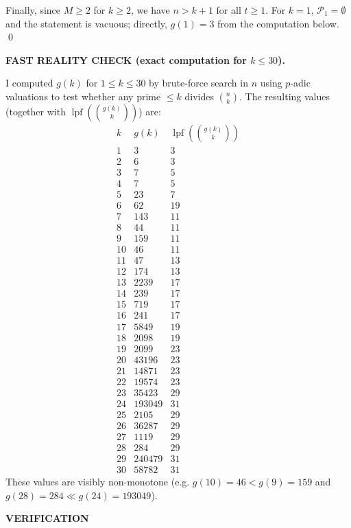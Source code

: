 Finally, since $M\ge 2$ for $k\ge 2$, we have $n>k+1$ for all $t\ge 1$. For $k=1$, $\mathcal{P}_1=\emptyset$ and the statement is vacuous; directly, $g(1)=3$ from the computation below. \qed

\smallskip
\noindent\textbf{FAST REALITY CHECK (exact computation for $k\le 30$).}

\smallskip
\noindent
I computed $g(k)$ for $1\le k\le 30$ by brute-force search in $n$ using $p$-adic valuations to test whether any prime $\le k$ divides $\binom{n}{k}$. The resulting values (together with $\operatorname{lpf}(\binom{g(k)}{k})$) are:
\[
\begin{array}{r|r|r}
 k & g(k) & \operatorname{lpf}\!\left(\binom{g(k)}{k}\right) \\\hline
 1& 3& 3\\
 2& 6& 3\\
 3& 7& 5\\
 4& 7& 5\\
 5& 23& 7\\
 6& 62& 19\\
 7& 143& 11\\
 8& 44& 11\\
 9& 159& 11\\
 10& 46& 11\\
 11& 47& 13\\
 12& 174& 13\\
 13& 2239& 17\\
 14& 239& 17\\
 15& 719& 17\\
 16& 241& 17\\
 17& 5849& 19\\
 18& 2098& 19\\
 19& 2099& 23\\
 20& 43196& 23\\
 21& 14871& 23\\
 22& 19574& 23\\
 23& 35423& 29\\
 24& 193049& 31\\
 25& 2105& 29\\
 26& 36287& 29\\
 27& 1119& 29\\
 28& 284& 29\\
 29& 240479& 31\\
 30& 58782& 31
\end{array}
\]
These values are visibly non-monotone (e.g. $g(10)=46<g(9)=159$ and $g(28)=284\ll g(24)=193049$).

\medskip
\noindent\textbf{VERIFICATION}

